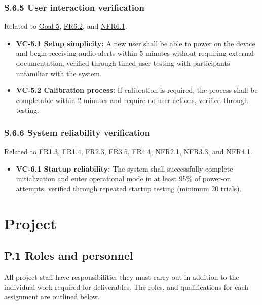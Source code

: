 \documentclass[12pt]{article}
\theoremstyle{definition}
\begin{document}
\subsubsection{S.6.5 User interaction verification}

Related to \hyperref[goal:user_friendly_interaction]{Goal 5}, 
\hyperref[FR6_2]{FR6.2}, and \hyperref[NFR6_1]{NFR6.1}.

\begin{itemize}
\item \textbf{VC-5.1 Setup simplicity:} A new user shall be able to power on 
the device and begin receiving audio alerts within 5 minutes without requiring 
external documentation, verified through timed user testing with participants 
unfamiliar with the system.

\item \textbf{VC-5.2 Calibration process:} If calibration is required, the 
process shall be completable within 2 minutes and require no
user actions, verified through testing.
\end{itemize}

\subsubsection{S.6.6 System reliability verification}

Related to \hyperref[FR1_3]{FR1.3}, \hyperref[FR1_4]{FR1.4}, \hyperref[FR2_3]{FR2.3}, 
\hyperref[FR3_5]{FR3.5}, \hyperref[FR4_4]{FR4.4}, \hyperref[NFR2_1]{NFR2.1}, 
\hyperref[NFR3_3]{NFR3.3}, and \hyperref[NFR4_1]{NFR4.1}.

\begin{itemize}
\item \textbf{VC-6.1 Startup reliability:} The system shall successfully 
complete initialization and enter operational mode in at least 95\% of power-on 
attempts, verified through repeated startup testing (minimum 20 trials).
\end{itemize}



\section{Project}

\subsection{P.1 Roles and personnel}\label{item: p1}

All project staff have responsibilities they must carry out in addition to the
 individual work required for deliverables. 
The roles, and qualifications for each assignment are outlined below. 
\end{document}
